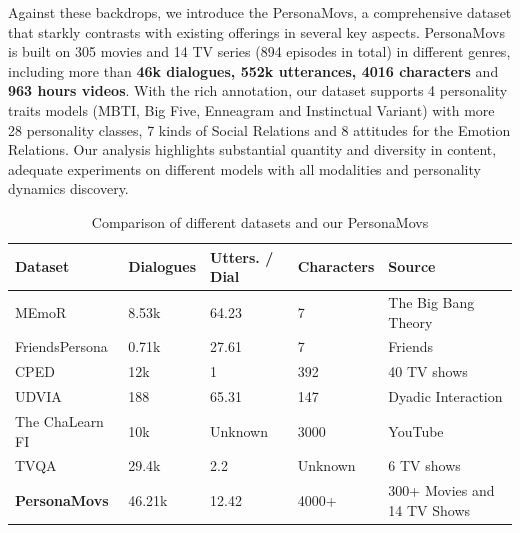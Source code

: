 Against these backdrops, we introduce the PersonaMovs, a comprehensive dataset that starkly contrasts with existing offerings in several key aspects. PersonaMovs is built on 305 movies and 14 TV series (894 episodes in total) in different genres, including more than \textbf{46k dialogues, 552k utterances, 4016 characters} and \textbf{963 hours videos}. With the rich annotation, our dataset supports 4 personality traits models (MBTI, Big Five, Enneagram and Instinctual Variant) with more 28 personality classes, 7 kinds of Social Relations and 8 attitudes for the Emotion Relations. Our analysis highlights substantial quantity and diversity in content, adequate experiments on different models with all modalities and personality dynamics discovery.

\begin{table}[h]
  \centering
  \small
  \begin{tabular}{lllll}
    \hline
    \textbf{Dataset} & \textbf{Dialogues} & \textbf{Utters. / Dial} & \textbf{Characters} & \textbf{Source}\\
    \hline
    MEmoR & 8.53k & 64.23 & 7 & The Big Bang Theory \\
    \hline
    FriendsPersona & 0.71k & 27.61 & 7 & Friends\\
    \hline
    CPED & 12k & 1 & 392 & 40 TV shows\\
    \hline
    UDVIA & 188 & 65.31 & 147 & Dyadic Interaction\\
    \hline
    The ChaLearn FI & 10k & Unknown & 3000 & YouTube\\
    \hline
    TVQA & 29.4k & 2.2 & Unknown & 6 TV shows\\
    \hline
    \textbf{PersonaMovs} & 46.21k & 12.42 & 4000+ & 300+ Movies and 14 TV Shows\\
    \hline
  \end{tabular}
  \caption{Comparison of different datasets and our PersonaMovs}
  \label{tab:accents}
\end{table}

